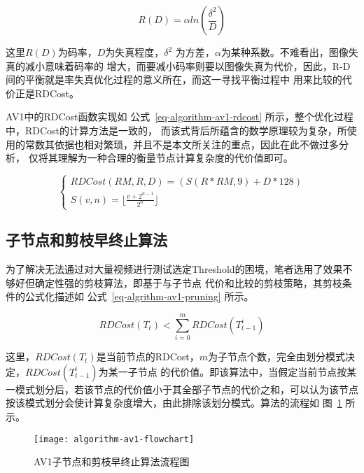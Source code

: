 \begin{equation}
\label{eq-algrithm-rdcost}
R(D) = \alpha ln(\frac{\delta^2}{D})
\end{equation}

这里$R(D)$为码率，$D$为失真程度，$\delta^2$ 为方差，$\alpha$为某种系数。不难看出，图像失真的减小意味着码率的
增大，而要减小码率则要以图像失真为代价，因此，R-D间的平衡就是率失真优化过程的意义所在，而这一寻找平衡过程中
用来比较的代价正是RDCost。

AV1中的RDCost函数实现如 公式~\ref{eq-algorithm-av1-rdcost} 所示，整个优化过程中，RDCost的计算方法是一致的，
而该式背后所蕴含的数学原理较为复杂，所使用的常数其依据也相对繁琐，并且不是本文所关注的重点，因此在此不做过多分析，
仅将其理解为一种合理的衡量节点计算复杂度的代价值即可。

\begin{equation}
\label{eq-algorithm-av1-rdcost}
\left\{\begin{array}{l}
RDCost(RM, R, D) = (S(R * RM, 9) + D * 128) \\
S(v, n) = \lfloor \frac{v + 2^{n-1}}{2^n} \rfloor
\end{array}\right.
\end{equation}

\subsection{子节点和剪枝早终止算法}

为了解决无法通过对大量视频进行测试选定Threshold的困境，笔者选用了效果不够好但确定性强的剪枝算法，即基于与子节点
代价和比较的剪枝策略，其剪枝条件的公式化描述如 公式~\ref{eq-algrithm-av1-pruning} 所示。

\begin{equation}
\label{eq-algrithm-av1-pruning}
RDCost(T_t) < \sum_{i=0}^m RDCost(T^i_{t-1})
\end{equation}

这里，$RDCost(T_t)$是当前节点的RDCost，$m$为子节点个数，完全由划分模式决定，$RDCost(T^i_{t-1})$为某一子节点
的代价值。即该算法中，当假定当前节点按某一模式划分后，若该节点的代价值小于其全部子节点的代价之和，可以认为该节点
按该模式划分会使计算复杂度增大，由此排除该划分模式。算法的流程如 图~\ref{fig:algorithm-av1-flowchart} 所示。

\begin{figure}[H] %
  \centering
  \texttt{[image: algorithm-av1-flowchart]}
  \caption{AV1子节点和剪枝早终止算法流程图}
  \label{fig:algorithm-av1-flowchart}
\end{figure}

